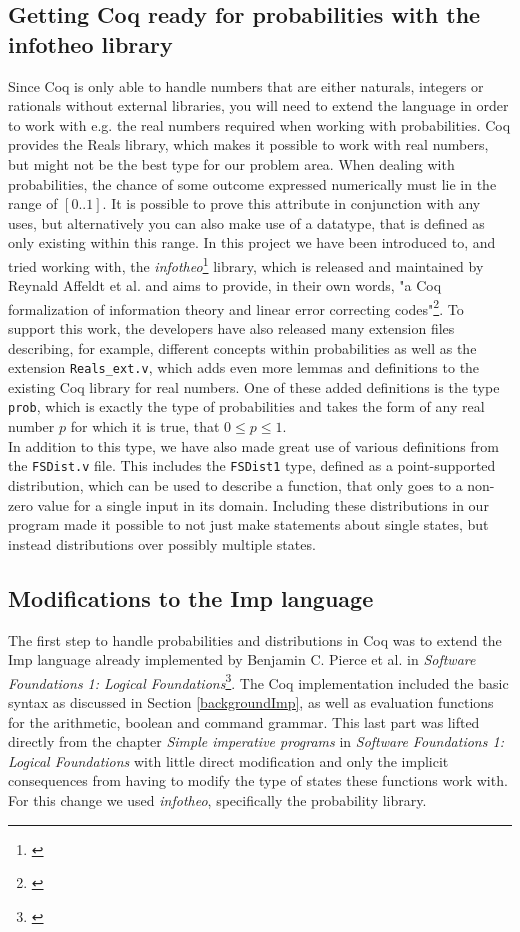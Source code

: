 \subsection{Getting Coq ready for probabilities with the infotheo library}
Since Coq is only able to handle numbers that are either naturals, integers or rationals without external libraries, you will need to extend the language in order to work with e.g. the real numbers required when working with probabilities. Coq provides the Reals library, which makes it possible to work with real numbers, but might not be the best type for our problem area. When dealing with probabilities, the chance of some outcome expressed numerically must lie in the range of $[0..1]$. It is possible to prove this attribute in conjunction with any uses, but alternatively you can also make use of a datatype, that is defined as only existing within this range. 
In this project we have been introduced to, and tried working with, the \textit{infotheo}\footnote{\textcite{infotheo}} library, which is released and maintained by Reynald Affeldt et al. and aims to provide, in their own words, "a Coq formalization of information theory and linear error correcting codes"\footnote{\textcite{infotheo}}. To support this work, the developers have also released many extension files describing, for example, different concepts within probabilities as well as the extension \texttt{Reals\_ext.v}, which adds even more lemmas and definitions to the existing Coq library for real numbers. One of these added definitions is the type \texttt{prob}, which is exactly the type of probabilities and takes the form of any real number $p$ for which it is true, that $0\leq p \leq 1$.\\ 

In addition to this type, we have also made great use of various definitions from the \texttt{FSDist.v} file. This includes the \texttt{FSDist1} type, defined as a point-supported distribution, which can be used to describe a function, that only goes to a non-zero value for a single input in its domain. Including these distributions in our program made it possible to not just make statements about single states, but instead distributions over possibly multiple states. 

\subsection{Modifications to the Imp language} \label{meatImp}
The first step to handle probabilities and distributions in Coq was to extend the Imp language already implemented by Benjamin C. Pierce et al. in \textit{Software Foundations 1: Logical Foundations}\footnote{\textcite{SF1}}. 
The Coq implementation included the basic syntax as discussed in Section \ref{backgroundImp}, as well as evaluation functions for the arithmetic, boolean and command grammar. 
This last part was lifted directly from the chapter \textit{Simple imperative programs} in \textit{Software Foundations 1: Logical Foundations} with little direct modification and only the implicit consequences from having to modify the type of states these functions work with. For this change we used \textit{infotheo}, specifically the probability library.

